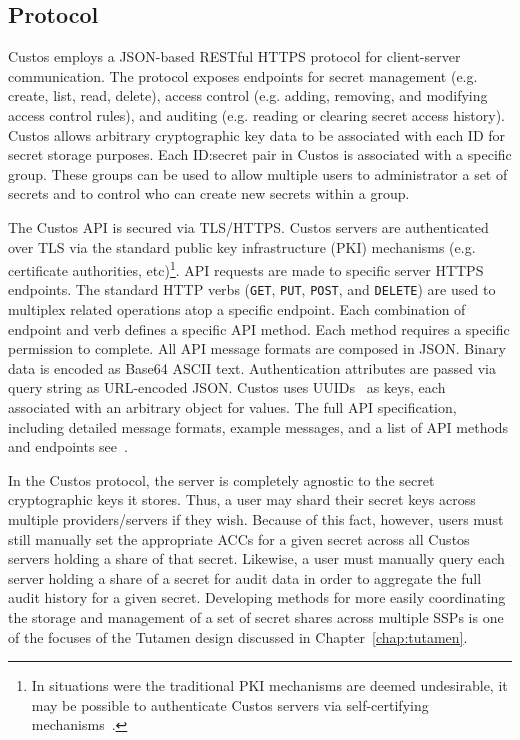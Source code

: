 \subsection{Protocol}

Custos employs a JSON-based RESTful HTTPS protocol for client-server
communication. The protocol exposes endpoints for secret management
(e.g. create, list, read, delete), access control (e.g. adding,
removing, and modifying access control rules), and auditing
(e.g. reading or clearing secret access history). Custos allows
arbitrary cryptographic key data to be associated with each ID for
secret storage purposes. Each ID:secret pair in Custos is associated
with a specific group. These groups can be used to allow multiple
users to administrator a set of secrets and to control who can create
new secrets within a group.

The Custos API is secured via TLS/HTTPS. Custos servers are
authenticated over TLS via the standard public key infrastructure
(PKI) mechanisms (e.g. certificate authorities, etc)\footnote{In
  situations were the traditional PKI mechanisms are deemed
  undesirable, it may be possible to authenticate Custos servers via
  self-certifying mechanisms~\cite{ellison1996, mazieres1999}.}. API
requests are made to specific server HTTPS endpoints. The standard
HTTP verbs (\texttt{GET}, \texttt{PUT}, \texttt{POST}, and
\texttt{DELETE}) are used to multiplex related operations atop a
specific endpoint. Each combination of endpoint and verb defines a
specific API method. Each method requires a specific permission to
complete. All API message formats are composed in JSON. Binary data is
encoded as Base64 ASCII text. Authentication attributes are passed via
query string as URL-encoded JSON. Custos uses UUIDs~\cite{leach2005}
as keys, each associated with an arbitrary object for values. The full
API specification, including detailed message formats, example
messages, and a list of API methods and endpoints
see~\cite{custos-masters}.

In the Custos protocol, the server is completely agnostic to the
secret cryptographic keys it stores. Thus, a user may shard their
secret keys across multiple providers/servers if they wish. Because of
this fact, however, users must still manually set the appropriate ACCs
for a given secret across all Custos servers holding a share of that
secret. Likewise, a user must manually query each server holding a
share of a secret for audit data in order to aggregate the full audit
history for a given secret. Developing methods for more easily
coordinating the storage and management of a set of secret shares
across multiple SSPs is one of the focuses of the Tutamen design
discussed in Chapter~\ref{chap:tutamen}.

